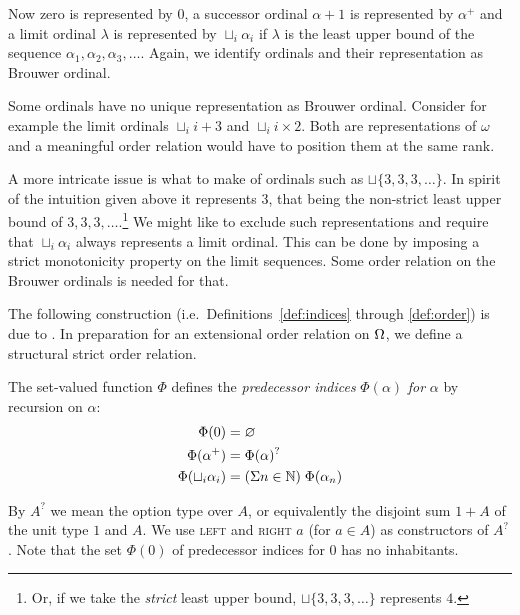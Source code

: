 Now zero is represented by $0$, a successor ordinal $\alpha +1$ is represented
by $\alpha^+$ and a limit ordinal $\lambda$ is represented by $\sqcup_i
\alpha_i$ if $\lambda$ is the least upper bound of the sequence $\alpha_1,
\alpha_2, \alpha_3, \ldots$. Again, we identify ordinals and their
representation as Brouwer ordinal.

Some ordinals have no unique representation as Brouwer ordinal. Consider for
example the limit ordinals $\sqcup_i i + 3$ and $\sqcup_i i \times 2$. Both
are representations of $\omega$ and a meaningful order relation would
have to position them at the same rank.

A more intricate issue is what to make of ordinals such as $\sqcup \{
3, 3, 3, \ldots \}$. In spirit of the intuition given above it
represents $3$, that being the non-strict least upper bound of $3, 3,
3, \ldots$.\footnote{Or, if we take the \emph{strict} least upper bound, $\sqcup \{
3, 3, 3, \ldots \}$ represents $4$.}
We might like to exclude such representations and require that
$\sqcup_i \alpha_i$ always represents a limit ordinal. This can be
done by imposing a strict monotonicity property on the limit
sequences. Some order relation on the Brouwer ordinals is needed for
that.

The following construction (i.e.\ Definitions~\ref{def:indices}
through \ref{def:order}) is due to \citet{hancock-08}. In preparation
for an extensional order relation on $\Omega$, we define a structural
strict order relation.

\begin{definition}\label{def:indices}%
The set-valued function $\Phi$ defines the \emph{predecessor indices}
$\Phi(\alpha)$ \emph{for} $\alpha$ by recursion on $\alpha$:
\begin{align*}
  \Phi(0)                 &= \varnothing \\
  \Phi(\alpha^+)          &= \Phi(\alpha)^? \\
  \Phi(\sqcup_i \alpha_i) &= (\Sigma n \in \mathbb{N}) \; \Phi(\alpha_n)
\end{align*}
\end{definition}

By $A^?$ we mean the option type over $A$, or equivalently the
disjoint sum $1 + A$ of the unit type $1$ and $A$. We use
\textsc{left} and \textsc{right $a$} (for $a \in A$) as constructors
of $A^?$. Note that the set $\Phi(0)$ of predecessor indices for $0$
has no inhabitants.

